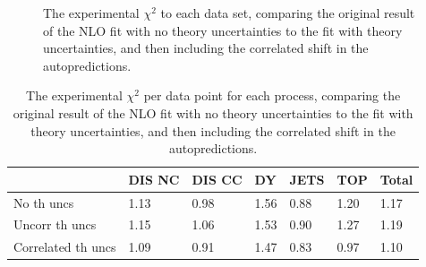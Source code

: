 \begin{figure}[h]
    \begin{center}
    \end{center}
  \vspace{-0.55cm}
  \caption{The experimental $\chi^2$ to each data set, comparing the original result of the NLO fit with no theory uncertainties to the fit with theory uncertainties, and then including the correlated shift in the autopredictions.}
  \label{fig:chi2auto}
\end{figure}
\begin{table}[H]
\centering
\begin{tabular}{|l||lllll|l|}
\hline
                   & \textbf{DIS NC} & \textbf{DIS CC} & \textbf{DY} & \textbf{JETS} & \textbf{TOP} & \textbf{Total} \\
                   \hline
No th uncs         & 1.13            & 0.98            & 1.56        & 0.88         & 1.20         & 1.17           \\
Uncorr th uncs     & 1.15            & 1.06            & 1.53        & 0.90         & 1.27         & 1.19           \\
Correlated th uncs & 1.09            & 0.91           & 1.47        & 0.83         & 0.97        & 1.10    \\
\hline
\end{tabular}
\caption{The experimental $\chi^2$ per data point for each process, comparing the original result of the NLO fit with no theory uncertainties to the fit with theory uncertainties, and then including the correlated shift in the autopredictions.}
  \label{tab:chisq}
\end{table}
